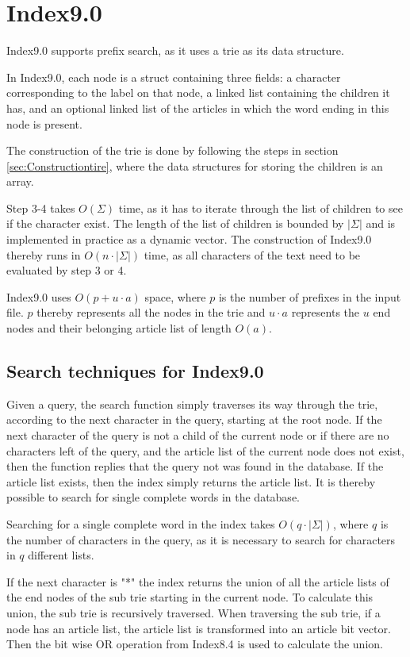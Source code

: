 \section{Index9.0}
Index9.0 supports prefix search, as it uses a trie as its data structure. 

In Index9.0, each node is a struct containing three fields: a character corresponding to the label on that node, a linked list containing the children it has, and an optional linked list of the articles in which the word ending in this node is present.

The construction of the trie is done by following the steps in section \ref{sec:Constructiontire}, where the data structures for storing the children is an array.

Step 3-4 takes $O(\Sigma)$ time, as it has to iterate through the list of children to see if the character exist. The length of the list of children is bounded by $|\Sigma|$ and is implemented in practice as a dynamic vector. The construction of Index9.0 thereby runs in $O(n\cdot|\Sigma|)$ time, as all characters of the text need to be evaluated by step 3 or 4.

Index9.0 uses $O(p + u\cdot a)$ space, where $p$ is the number of prefixes in the input file. $p$ thereby represents all the nodes in the trie and $ u\cdot a$ represents the $u$ end nodes and their belonging article list of length $O(a)$.

\subsection{Search techniques for Index9.0}
Given a query, the search function simply traverses its way through the trie, according to the next character in the query, starting at the root node. If the next character of the query is not a child of the current node or if there are no characters left of the query, and the article list of the current node does not exist, then the function replies that the query not was found in the database. If the article list exists, then the index simply returns the article list. It is thereby possible to search for single complete words in the database.

Searching for a single complete word in the index takes $O(q\cdot |\Sigma|)$, where $q$ is the number of characters in the query, as it is necessary to search for characters in $q$ different lists. 

If the next character is "*" the index returns the union of all the article lists of the end nodes of the sub trie starting in the current node. To calculate this union, the sub trie is recursively traversed. When traversing the sub trie, if a node has an article list, the article list is transformed into an article bit vector. Then the bit wise OR operation from Index8.4 is used to calculate the union.

